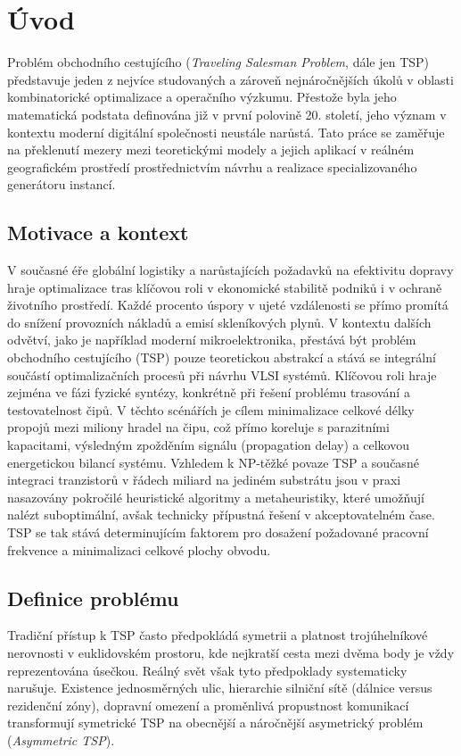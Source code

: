 \chapter{Úvod}
\label{sec:Introduction}
Problém obchodního cestujícího (\textit{Traveling Salesman Problem}, dále jen TSP) představuje jeden z nejvíce studovaných a zároveň nejnáročnějších úkolů v oblasti kombinatorické optimalizace a operačního výzkumu. Přestože byla jeho matematická podstata definována již v první polovině 20. století, jeho význam v kontextu moderní digitální společnosti neustále narůstá. Tato práce se zaměřuje na překlenutí mezery mezi teoretickými modely a jejich aplikací v reálném geografickém prostředí prostřednictvím návrhu a realizace specializovaného generátoru instancí.

\section{Motivace a kontext}
V současné éře globální logistiky a narůstajících požadavků na efektivitu dopravy hraje optimalizace tras klíčovou roli v ekonomické stabilitě podniků i v ochraně životního prostředí. Každé procento úspory v ujeté vzdálenosti se přímo promítá do snížení provozních nákladů a emisí skleníkových plynů. V kontextu dalších odvětví, jako je například moderní mikroelektronika, přestává být problém obchodního cestujícího (TSP) pouze teoretickou abstrakcí a stává se integrální součástí optimalizačních procesů při návrhu VLSI systémů. Klíčovou roli hraje zejména ve fázi fyzické syntézy, konkrétně při řešení problému trasování a testovatelnost čipů. V těchto scénářích je cílem minimalizace celkové délky propojů mezi miliony hradel na čipu, což přímo koreluje s parazitními kapacitami, výsledným zpožděním signálu (propagation delay) a celkovou energetickou bilancí systému. Vzhledem k NP-těžké povaze TSP a současné integraci tranzistorů v řádech miliard na jediném substrátu jsou v praxi nasazovány pokročilé heuristické algoritmy a metaheuristiky, které umožňují nalézt suboptimální, avšak technicky přípustná řešení v akceptovatelném čase. TSP se tak stává determinujícím faktorem pro dosažení požadované pracovní frekvence a minimalizaci celkové plochy obvodu.

\section{Definice problému}
Tradiční přístup k TSP často předpokládá symetrii a platnost trojúhelníkové nerovnosti v euklidovském prostoru, kde nejkratší cesta mezi dvěma body je vždy reprezentována úsečkou. Reálný svět však tyto předpoklady systematicky narušuje. Existence jednosměrných ulic, hierarchie silniční sítě (dálnice versus rezidenční zóny), dopravní omezení a proměnlivá propustnost komunikací transformují symetrické TSP na obecnější a náročnější asymetrický problém (\textit{Asymmetric TSP}).

